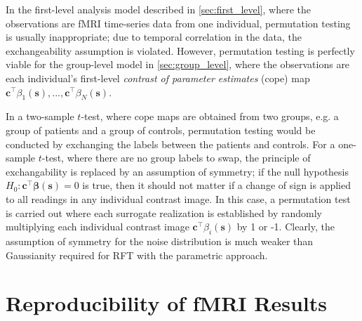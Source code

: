 In the first-level analysis model described in \ref{sec:first_level}, where the observations are fMRI time-series data from one individual, permutation testing is usually inappropriate; due to temporal correlation in the data, the exchangeability assumption is violated. However, permutation testing is perfectly viable for the group-level model in \ref{sec:group_level}, where the observations are each individual's first-level \textit{contrast of parameter estimates} (cope) map $\bm{c}^{\intercal}\beta_{1}(\bm{s}), ..., \bm{c}^{\intercal}\beta_{N}(\bm{s})$.

In a two-sample $t$-test, where cope maps are obtained from two groups, e.g. a group of patients and a group of controls, permutation testing would be conducted by exchanging the labels between the patients and controls. For a one-sample $t$-test, where there are no group labels to swap, the principle of exchangability is replaced by an assumption of symmetry; if the null hypothesis $H_{0} : \bm{c}^{\intercal}\bm{\beta}(\bm{s}) = 0$ is true, then it should not matter if a change of sign is applied to all readings in any individual contrast image. In this case, a permutation test is carried out where each surrogate realization is established by randomly multiplying each individual contrast image $\bm{c}^{\intercal}\beta_{i}(\bm{s})$ by 1 or -1. Clearly, the assumption of symmetry for the noise distribution is much weaker than Gaussianity required for RFT with the parametric approach.

\section{Reproducibility of fMRI Results}

